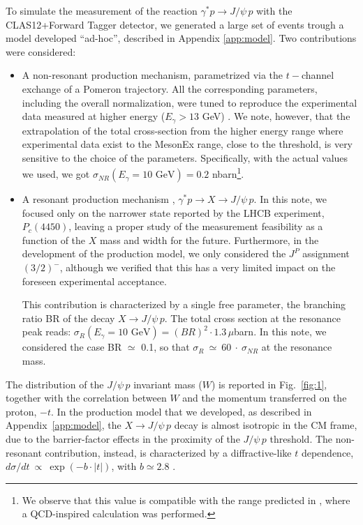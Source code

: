 \documentclass[a4paper,10pt]{article}
\begin{document}
To simulate the measurement of the reaction $\gamma^* p \rightarrow J/\psi \, p$ with the CLAS12+Forward Tagger detector, we generated a large set of events trough a model developed ``ad-hoc'', described in Appendix \ref{app:model}. Two contributions were considered:
\begin{itemize}
\item{A non-resonant production mechanism, parametrized via the $t-$channel exchange of a Pomeron trajectory. 
All the corresponding parameters, including the overall normalization, were tuned to reproduce the experimental data measured at higher energy  ($E_{\gamma} > 13$ GeV) \cite{Camerini:1975cy}. 
We note, however, that the extrapolation of the total cross-section from the higher energy range where experimental data exist to the MesonEx range, close to the threshold, is very sensitive to the choice of the parameters. 
Specifically, with the actual values we used, we got $\sigma_{NR}(E_{\gamma}=10 \mbox{ GeV} ) = 0.2 $ nbarn\footnote
{
We observe that this value is compatible with the range predicted in \cite{Brodsky:2000zc}, where a QCD-inspired calculation was performed.}.
} 
\item{A resonant production mechanism  , $\gamma^* p \rightarrow X \rightarrow J/\psi \, p$. In this note, we focused only on the narrower state reported by the LHCB experiment, $P_c(4450)$, leaving a proper study of the measurement feasibility as a function of the $X$ mass and width for the future. Furthermore, in the development of the production model, we only considered the $J^P$ assignment $(3/2)^-$, although we verified that this has a very limited impact on the foreseen experimental acceptance. 

This contribution is characterized by a single free parameter, the branching ratio BR of the decay $X \rightarrow J/\psi \, p$. The total cross section at the resonance peak reads: $\sigma_{R}(E_{\gamma}=10 \mbox{ GeV} ) = (BR)^{2}\cdot 1.3 \, \mu$barn. In this note, we considered the case BR $\simeq$ 0.1, so that $\sigma_{R}~\simeq~60~\cdot~\sigma_{NR}$ at the resonance mass.}
\end{itemize}

The distribution of the  $J/\psi \, p$ invariant mass ($W$) is reported in Fig.~\ref{fig:1}, together with the correlation between $W$ and the momentum transferred on the proton, $-t$. In the production model that we developed, as described in Appendix~\ref{app:model}, the $X\rightarrow J/\psi \, p$ decay is almost isotropic in the CM frame, due to the barrier-factor effects in the proximity of the $J/\psi \, p$ threshold. The non-resonant contribution, instead, is characterized by a diffractive-like $t$ dependence, $d\sigma / d t~\propto~\exp(- b \cdot |t|)$, with $b\simeq 2.8$ \cite{Camerini:1975cy}.
\end{document}
